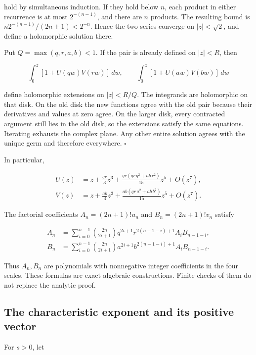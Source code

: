 hold by simultaneous induction. If they hold below \(n\), each product
in either recurrence is at most \(2^{-(n-1)}\), and there are \(n\)
products. The resulting bound is \(n2^{-(n-1)}/(2n+1)<2^{-n}\). Hence
the two series converge on \(|z|<\sqrt2\), and define a holomorphic
solution there.

Put \(Q=\max(q,r,a,b)<1\). If the pair is already defined on \(|z|<R\),
then

\[
\int_0^z[1+U(qw)V(rw)]\,dw,\qquad
\int_0^z[1+U(aw)V(bw)]\,dw
\]

define holomorphic extensions on \(|z|<R/Q\). The integrands are
holomorphic on that disk. On the old disk the new functions agree with
the old pair because their derivatives and values at zero agree. On the
larger disk, every contracted argument still lies in the old disk, so
the extensions satisfy the same equations. Iterating exhausts the
complex plane. Any other entire solution agrees with the unique germ and
therefore everywhere. \(\square\)

In particular,

\[
\begin{aligned}
U(z)&=z+\frac{qr}{3}z^3
 +\frac{qr(qr\,q^2+ab\,r^2)}{15}z^5+O(z^7),\\
V(z)&=z+\frac{ab}{3}z^3
 +\frac{ab(qr\,a^2+ab\,b^2)}{15}z^5+O(z^7).
\end{aligned}
\]

The factorial coefficients \(A_n=(2n+1)!u_n\) and \(B_n=(2n+1)!v_n\)
satisfy

\[
\begin{aligned}
A_n&=\sum_{i=0}^{n-1}\binom{2n}{2i+1}
 q^{2i+1}r^{2(n-1-i)+1}A_iB_{n-1-i},\\
B_n&=\sum_{i=0}^{n-1}\binom{2n}{2i+1}
 a^{2i+1}b^{2(n-1-i)+1}A_iB_{n-1-i}.
\end{aligned}
\]

Thus \(A_n,B_n\) are polynomials with nonnegative integer coefficients
in the four scales. These formulas are exact algebraic constructions.
Finite checks of them do not replace the analytic proof.

\hypertarget{v11-coupled_growth_full-the-characteristic-exponent-and-its-positive-vector}{%
\subsection{The characteristic exponent and its positive
vector}\label{v11-coupled_growth_full-the-characteristic-exponent-and-its-positive-vector}}

For \(s>0\), let

